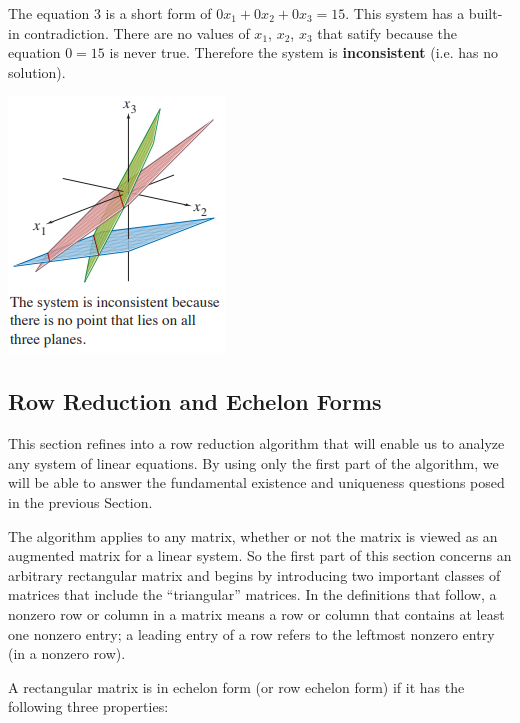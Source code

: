\documentclass{article}
\begin{document}
\noindent The equation 3 is a short form of $0x_1 + 0x_2 + 0x_3 = 15$. This system has a built-in contradiction. There are no values of $x_1$, $x_2$, $x_3$ that satify because the equation $0=15$ is never true. Therefore the system is \textbf{inconsistent} (i.e. has no solution).

\includegraphics{image3.png}

\subsection{Row Reduction and Echelon Forms}

This section refines into a row reduction algorithm that will enable us to analyze any system of linear equations. By using only the first part of the algorithm, we will be able to answer the fundamental existence and uniqueness questions posed in the previous Section.\newline

The algorithm applies to any matrix, whether or not the matrix is viewed as an augmented matrix for a linear system. So the first part of this section concerns an arbitrary rectangular matrix and begins by introducing two important classes of matrices that include the “triangular” matrices. In the definitions that follow, a nonzero row or column in a matrix means a row or column that contains at least one nonzero entry; a leading entry of a row refers to the leftmost nonzero entry (in a nonzero row).\newline

A  rectangular matrix is in echelon form (or row echelon form) if it has the following three properties:
\end{document}
